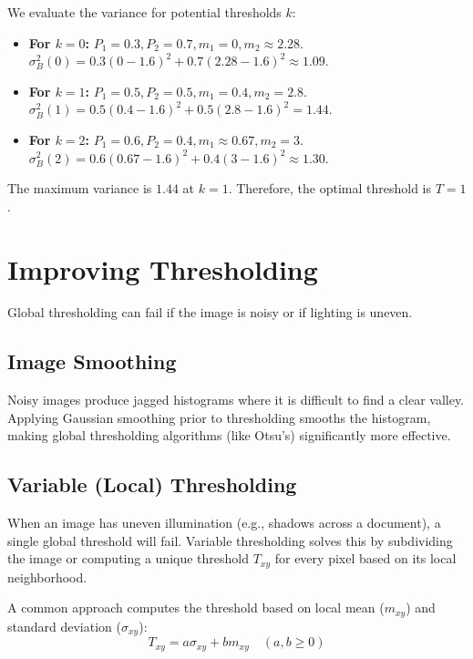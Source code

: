 \documentclass{report}
\begin{document}
We evaluate the variance for potential thresholds $k$:
\begin{itemize}
    \item \textbf{For $k=0$:} $P_1 = 0.3, P_2 = 0.7, m_1 = 0, m_2 \approx 2.28$. \\ $\sigma_B^2(0) = 0.3(0 - 1.6)^2 + 0.7(2.28 - 1.6)^2 \approx 1.09$.
    \item \textbf{For $k=1$:} $P_1 = 0.5, P_2 = 0.5, m_1 = 0.4, m_2 = 2.8$. \\ $\sigma_B^2(1) = 0.5(0.4 - 1.6)^2 + 0.5(2.8 - 1.6)^2 = 1.44$.
    \item \textbf{For $k=2$:} $P_1 = 0.6, P_2 = 0.4, m_1 \approx 0.67, m_2 = 3$. \\ $\sigma_B^2(2) = 0.6(0.67 - 1.6)^2 + 0.4(3 - 1.6)^2 \approx 1.30$.
\end{itemize}
The maximum variance is $1.44$ at $k=1$. Therefore, the optimal threshold is $T=1$.

\chapter{Improving Thresholding}

Global thresholding can fail if the image is noisy or if lighting is uneven.

\section{Image Smoothing}
Noisy images produce jagged histograms where it is difficult to find a clear valley. Applying Gaussian smoothing prior to thresholding smooths the histogram, making global thresholding algorithms (like Otsu's) significantly more effective.

\section{Variable (Local) Thresholding}
When an image has uneven illumination (e.g., shadows across a document), a single global threshold will fail. Variable thresholding solves this by subdividing the image or computing a unique threshold $T_{xy}$ for every pixel based on its local neighborhood.

A common approach computes the threshold based on local mean ($m_{xy}$) and standard deviation ($\sigma_{xy}$):
\begin{equation}
    T_{xy} = a \sigma_{xy} + b m_{xy} \quad (a, b \ge 0)
\end{equation}
\end{document}
